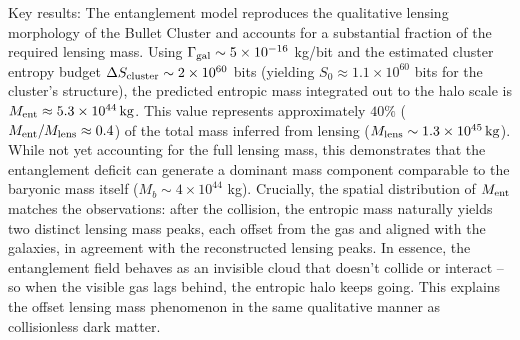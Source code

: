 \documentclass[11pt]{article}
\begin{document}
Key results: The entanglement model reproduces the qualitative lensing morphology of the Bullet Cluster and accounts for a substantial fraction of the required lensing mass. Using $\Gamma_{\rm gal} \sim 5 \times 10^{-16}$ kg/bit and the estimated cluster entropy budget $\Delta S_{\rm cluster} \sim 2 \times 10^{60}$ bits (yielding $S_0 \approx 1.1 \times 10^{60}$ bits for the cluster's structure), the predicted entropic mass integrated out to the halo scale is $M_{\rm ent} \approx 5.3 \times 10^{44}\,\mathrm{kg}$. This value represents approximately $40\%$ ($M_{\rm ent} / M_{\rm lens} \approx 0.4$) of the total mass inferred from lensing ($M_{\rm lens} \sim 1.3 \times 10^{45}\,\mathrm{kg}$). While not yet accounting for the full lensing mass, this demonstrates that the entanglement deficit can generate a dominant mass component comparable to the baryonic mass itself ($M_b \sim 4\times10^{44}$ kg). Crucially, the spatial distribution of $M_{\rm ent}$ matches the observations: after the collision, the entropic mass naturally yields two distinct lensing mass peaks, each offset from the gas and aligned with the galaxies, in agreement with the reconstructed lensing peaks. In essence, the entanglement field behaves as an invisible cloud that doesn’t collide or interact – so when the visible gas lags behind, the entropic halo keeps going. This explains the offset lensing mass phenomenon in the same qualitative manner as collisionless dark matter.
\end{document}
